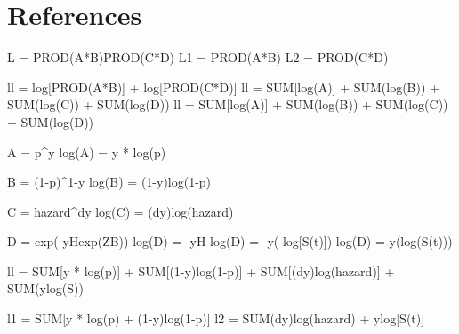 \newpage
\section{References}
\printbibliography[heading = none]






\begin{comment} %
# Structural factors that enable self-enforcing agreements
# Factors that result in changes to self-enforcing agreements



\begin{comment}
Table \ref{tab_sim_60_10_haz} presents the estimated hazard coefficients ($\beta_i$) for each of the models run. 
\begin{table}
\caption{Average Estimates of Hazard Coefficients for Simulated Datasets}
\label{tab_sim_60_10_haz}

\end{table}

\begin{table}
\caption{Average Estimates of Latency Coefficients for Simulated Datasets}
\label{tab_sim_60_10_lat}

\end{table}
\end{comment}



L = PROD(A*B)PROD(C*D)
L1 = PROD(A*B)
L2 = PROD(C*D)

ll = log[PROD(A*B)] + log[PROD(C*D)]
ll = {SUM[log(A)] + SUM(log(B))} + {SUM(log(C)) + SUM(log(D))}
ll = SUM[log(A)] + SUM(log(B)) + SUM(log(C)) + SUM(log(D))

A = p^y
log(A) = y * log(p)

B = (1-p)^{1-y}
log(B) = (1-y)log(1-p)

C = {hazard}^dy
log(C) = (dy)log(hazard)

D = exp(-yHexp(ZB))
log(D) = -yH
log(D) = -y(-log[S(t)])
log(D) = y(log(S(t)))

ll = SUM[y * log(p)] + SUM[(1-y)log(1-p)] + SUM[(dy)log(hazard)] + SUM(ylog(S))

l1 = SUM[y * log(p) + (1-y)log(1-p)]
l2 = SUM{(dy)log(hazard) + ylog[S(t)]} %


